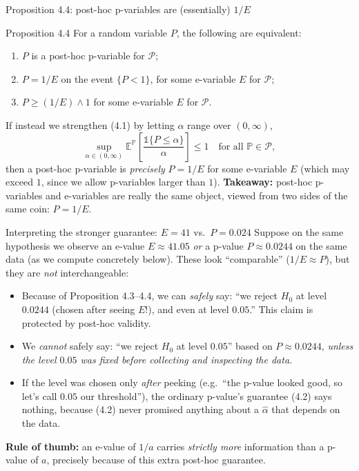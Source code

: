 \documentclass[aspectratio=169,10pt]{beamer}
\begin{document}
\begin{frame}{Proposition 4.4: post-hoc p-variables are (essentially) $1/E$}
  \begin{block}{Proposition 4.4}
    For a random variable $P$, the following are equivalent:
    \begin{enumerate}
      \item $P$ is a post-hoc p-variable for $\mathcal P$;
      \item $P = 1/E$ on the event $\{P<1\}$, for some e-variable $E$ for $\mathcal P$;
      \item $P \ge (1/E)\wedge 1$ for some e-variable $E$ for $\mathcal P$.
    \end{enumerate}
  \end{block}
  If instead we strengthen (4.1) by letting $\alpha$ range over $(0,\infty)$,
  \[
    \sup_{\alpha\in(0,\infty)} \mathbb E^{\mathbb P}\!\left[\frac{\mathbb 1\{P\le\alpha\}}{\alpha}\right]\le 1
    \quad\text{for all }\mathbb P\in\mathcal P, \tag{4.6}
  \]
  then a post-hoc p-variable is \emph{precisely} $P=1/E$ for some e-variable
  $E$ (which may exceed $1$, since we allow p-variables larger than $1$).
  \textbf{Takeaway:} post-hoc p-variables and e-variables are really the same
  object, viewed from two sides of the same coin: $P = 1/E$.
\end{frame}

\begin{frame}{Interpreting the stronger guarantee: $E=41$ vs.\ $P=0.024$}
  Suppose on the same hypothesis we observe an e-value $E\approx 41.05$
  \emph{or} a p-value $P\approx 0.0244$ on the same data (as we compute
  concretely below). These look ``comparable'' ($1/E\approx P$), but they are
  \emph{not} interchangeable:
  \begin{itemize}
    \item Because of Proposition 4.3--4.4, we can \emph{safely} say: ``we
    reject $H_0$ at level $0.0244$ (chosen after seeing $E$!), and even at
    level $0.05$.'' This claim is protected by post-hoc validity.
    \item We \emph{cannot} safely say: ``we reject $H_0$ at level $0.05$''
    based on $P\approx 0.0244$, \emph{unless the level $0.05$ was fixed
    before collecting and inspecting the data.}
    \item If the level was chosen only \emph{after} peeking (e.g.\ ``the
    p-value looked good, so let's call $0.05$ our threshold''), the ordinary
    p-value's guarantee (4.2) says nothing, because (4.2) never promised
    anything about a $\hat\alpha$ that depends on the data.
  \end{itemize}
  \textbf{Rule of thumb:} an e-value of $1/a$ carries \emph{strictly more}
  information than a p-value of $a$, precisely because of this extra
  post-hoc guarantee.
\end{frame}
\end{document}
